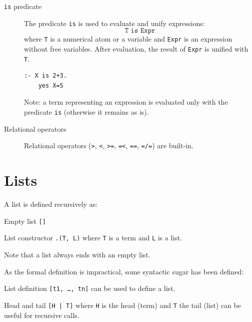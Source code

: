\begin{description}
    \item[\texttt{is} predicate]
        The predicate \texttt{is} is used to evaluate and unify expressions:
        \[ \texttt{T is Expr} \]
        where \texttt{T} is a numerical atom or a variable and \texttt{Expr} is an expression without free variables.
        After evaluation, the result of \texttt{Expr} is unified with \texttt{T}.

        \begin{example} \phantom{}
            \begin{lstlisting}[language={}]
    :- X is 2+3.
    yes X=5
            \end{lstlisting}
        \end{example}

        Note: a term representing an expression is evaluated only with the predicate \texttt{is} (otherwise it remains as is).

    \item[Relational operators]
        Relational operators (\texttt{>}, \texttt{<}, \texttt{>=}, \texttt{=<}, \texttt{==}, \texttt{=/=}) are built-in.
\end{description}



\section{Lists}

A list is defined recursively as:
\begin{descriptionlist}
    \item[Empty list] \texttt{[]}
    \item[List constructor] \texttt{.(T, L)} where \texttt{T} is a term and \texttt{L} is a list.
\end{descriptionlist}
Note that a list always ends with an empty list.

As the formal definition is impractical, some syntactic sugar has been defined:
\begin{descriptionlist}
    \item[List definition] \texttt{[t1, \dots, tn]} can be used to define a list.  
    \item[Head and tail] \texttt{[H | T]} where \texttt{H} is the head (term) and \texttt{T} the tail (list) can be useful for recursive calls.
\end{descriptionlist}



